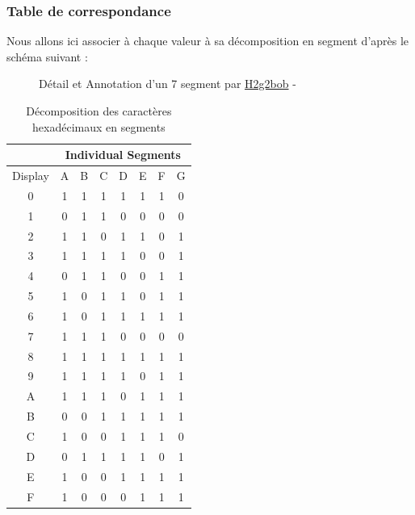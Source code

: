 \subsubsection{Table de correspondance}
Nous allons ici associer à chaque valeur à sa décomposition en segment d'après le schéma suivant :
\begin{figure}[H]
	\caption{Détail et Annotation d'un 7 segment par \href{https://commons.wikimedia.org/wiki/User:H2g2bob}{H2g2bob} - \ccLogo\ccAttribution\ccShareAlike}
\end{figure}

\begin{table}[h]
\centering
\begin{tabular}{|c|c|c|c|c|c|c|c|}
	\hline
		& \multicolumn{7}{c|}{Individual Segments} \\
	\hline
	Display & A & B & C & D & E & F & G \\
	\hline
	0       & 1 & 1 & 1 & 1 & 1 & 1 & 0 \\
	\hline
	1       & 0 & 1 & 1 & 0 & 0 & 0 & 0 \\
	\hline
	2       & 1 & 1 & 0 & 1 & 1 & 0 & 1 \\
	\hline
	3       & 1 & 1 & 1 & 1 & 0 & 0 & 1 \\
	\hline
	4       & 0 & 1 & 1 & 0 & 0 & 1 & 1 \\
	\hline
	5       & 1 & 0 & 1 & 1 & 0 & 1 & 1 \\
	\hline
	6       & 1 & 0 & 1 & 1 & 1 & 1 & 1 \\
	\hline
	7       & 1 & 1 & 1 & 0 & 0 & 0 & 0 \\
	\hline
	8       & 1 & 1 & 1 & 1 & 1 & 1 & 1 \\
	\hline
	9       & 1 & 1 & 1 & 1 & 0 & 1 & 1 \\
	\hline
	A       & 1 & 1 & 1 & 0 & 1 & 1 & 1 \\
	\hline
	B       & 0 & 0 & 1 & 1 & 1 & 1 & 1 \\
	\hline
	C       & 1 & 0 & 0 & 1 & 1 & 1 & 0 \\
	\hline
	D       & 0 & 1 & 1 & 1 & 1 & 0 & 1 \\
	\hline
	E       & 1 & 0 & 0 & 1 & 1 & 1 & 1 \\
	\hline
	F       & 1 & 0 & 0 & 0 & 1 & 1 & 1 \\
	\hline
\end{tabular}
	\caption{Décomposition des caractères hexadécimaux en segments}
\end{table}


